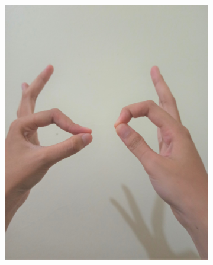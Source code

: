 \documentclass[conference]{IEEEtran}
\begin{document}
\begin{figure} [h]
\begin{center}
\begin{subfigure}[t]{0.11\textwidth}
			\includegraphics[width=\textwidth]{img/pola2.jpg}
			\caption{\label{fig:gs2}}
		\end{subfigure}
		\hspace{0.1em}
		\begin{subfigure}[t]{0.11\textwidth}

\end{subfigure}
\end{center}
\end{figure}
\end{document}

